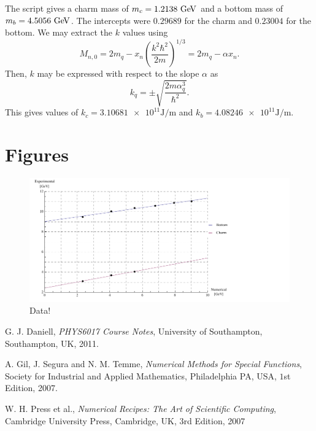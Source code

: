 \documentclass[]{article}
\begin{document}
The script gives a charm mass of $m_{c} = 1.2138\GeV$ and a bottom mass of $m_{b} = 4.5056\GeV$. The intercepts were $0.29689$ for the charm and $0.23004$ for the bottom. We may extract the $k$ values using
$$M_{n,0} = 2m_{q} - x_{n}\left(\frac{k^{2}\hbar^{2}}{2m}\right)^{1/3} = 2m_{q} - \alpha x_{n}.$$
Then, $k$ may be expressed with respect to the slope $\alpha$ as
$$k_{q} = \pm\sqrt{\frac{2m\alpha_{q}^{3}}{\hbar^{2}}}.$$
This gives values of $k_{c} = \num{3.10681e11}\si{\joule\per\metre}$ and $k_{b} = \num{4.08246e11}\si{\joule\per\metre}$.


\section{Figures}\label{sec:figures}

\begin{figure}[H]
	\hspace*{-0.15\textwidth}
	\centering
	\includegraphics[scale=1.3]{experimental-numerical}
	\caption{Data!}
	\label{fig:data}
\end{figure}

\begin{thebibliography}{9}
  G. J. Daniell,
  \emph{PHYS6017 Course Notes},
  University of Southampton, Southampton, UK,
  2011.
  
  A. Gil, J. Segura and N. M. Temme,
  \emph{Numerical Methods for Special Functions},
  Society for Industrial and Applied Mathematics, Philadelphia PA, USA,
  $1$st Edition,
  2007.
  
  W. H. Press et al.,
  \emph{Numerical Recipes: The Art of Scientific Computing},
  Cambridge University Press, Cambridge, UK,
  $3$rd Edition,
  2007
  
\end{thebibliography}
\end{document}
